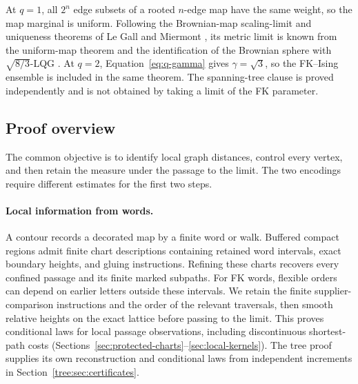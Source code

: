 At \(q=1\), all \(2^n\) edge subsets of a rooted \(n\)-edge map have
the same weight, so the map marginal is uniform. Following the
Brownian-map scaling-limit and uniqueness theorems of Le Gall and
Miermont \cite{LeGallBrownianMap,MiermontBrownianMap}, its metric limit
is known from the uniform-map theorem
\cite[Corollary~1.2]{BettinelliJacobMiermontUniform} and the identification
of the Brownian sphere with \(\sqrt{8/3}\)-LQG
\cite[Theorem~1.4]{MillerSheffieldBrownianII}
\cite[Corollary~1.4]{GwynneMillerMetric}.
At \(q=2\), Equation~\eqref{eq:q-gamma} gives \(\gamma=\sqrt3\), so
the FK--Ising ensemble is included in the same theorem.
The spanning-tree clause is proved independently and is not obtained
by taking a limit of the FK parameter.

\subsection{Proof overview}

The common objective is to identify local graph distances, control every
vertex, and then retain the measure under the passage to the limit.
The two encodings require different estimates for the first two steps.

\paragraph{Local information from words.}
A contour records a decorated map by a finite word or walk. Buffered
compact regions admit finite chart descriptions containing retained word
intervals, exact boundary heights, and gluing instructions. Refining
these charts recovers every confined passage and its finite marked
subpaths. For FK words, flexible orders can depend on earlier letters
outside these intervals. We retain the finite supplier-comparison
instructions and the order of the relevant traversals, then smooth
relative heights on the exact lattice before passing to the limit.
This proves conditional laws for local passage observations,
including discontinuous shortest-path costs
(Sections~\ref{sec:protected-charts}--\ref{sec:local-kernels}).
The tree proof supplies its own reconstruction and conditional laws from
independent increments in Section~\ref{tree:sec:certificates}.

